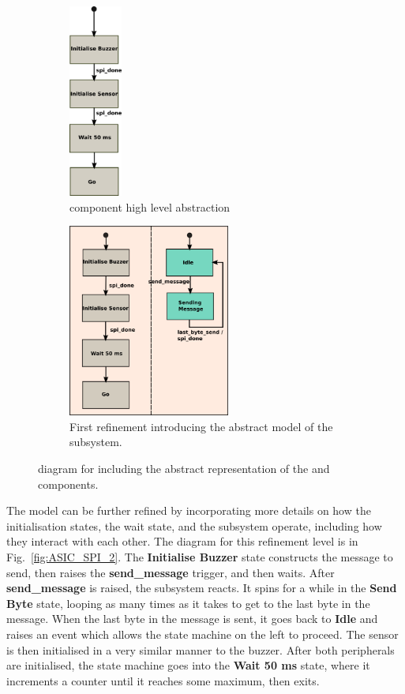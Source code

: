 \begin{figure}[]
	    \begin{subfigure}[t]{0.3\textwidth}
	        \begin{centering}
	        \includegraphics[height=2.5in]{figures/ASIC}
	        \caption{\ASIC component high level abstraction}
	        \label{fig:ASIC}
	        \end{centering}
	    \end{subfigure}
\qquad
	    \begin{subfigure}[t]{0.5\textwidth}
	        \includegraphics[height=2.5in]{figures/ASIC&SPI_1}
	        \caption{First refinement introducing the abstract model of the \SPI subsystem.}
	        \label{fig:ASIC_SPI_1}
	    \end{subfigure}
	    \caption{\Statechart diagram for \IDS including the abstract representation of the \ASIC and \SPI components.}
\end{figure}

The model can be further refined by incorporating more details on how the initialisation states, the wait state, and the \SPI subsystem operate, including how they interact with each other. The \statechart diagram for this refinement level is in Fig.~\ref{fig:ASIC_SPI_2}. The \textbf{Initialise Buzzer} state constructs the \SPI message to send, then raises the \textbf{send\_message} trigger, and then waits.
After \textbf{send\_message} is raised, the \SPI subsystem reacts. It spins for a while in the \textbf{Send Byte} state, looping as many times as it takes to get to the last byte in the message. When the last byte in the message is sent, it goes back to \textbf{Idle} and raises an event which allows the state machine on the left to proceed. The sensor is then initialised in a very similar manner to the buzzer. After both peripherals are initialised, the state machine goes into the \textbf{Wait 50 ms} state, where it increments a counter until it reaches some maximum, then exits.

